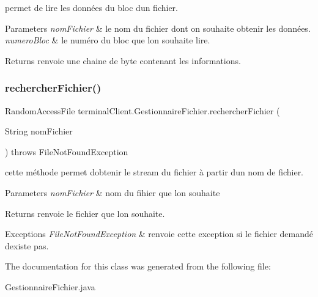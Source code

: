 permet de lire les données du bloc d\textquotesingle{}un fichier. 


\begin{DoxyParams}{Parameters}
{\em nom\+Fichier} & le nom du fichier dont on souhaite obtenir les données. \\
\hline
{\em numero\+Bloc} & le numéro du bloc que l\textquotesingle{}on souhaite lire. \\
\hline
\end{DoxyParams}
\begin{DoxyReturn}{Returns}
renvoie une chaine de byte contenant les informations. 
\end{DoxyReturn}
\mbox{\label{classterminalClient_1_1GestionnaireFichier_ae1ecacc9776836d965a472406f4e9584}} 
\subsubsection{\texorpdfstring{rechercher\+Fichier()}{rechercherFichier()}}
{\footnotesize\ttfamily Random\+Access\+File terminal\+Client.\+Gestionnaire\+Fichier.\+rechercher\+Fichier (\begin{DoxyParamCaption}\item[{String}]{nom\+Fichier }\end{DoxyParamCaption}) throws File\+Not\+Found\+Exception\hspace{0.3cm}{\ttfamily [inline]}}



cette méthode permet d\textquotesingle{}obtenir le stream du fichier à partir d\textquotesingle{}un nom de fichier. 


\begin{DoxyParams}{Parameters}
{\em nom\+Fichier} & nom du fihier que l\textquotesingle{}on souhaite \\
\hline
\end{DoxyParams}
\begin{DoxyReturn}{Returns}
renvoie le fichier que l\textquotesingle{}on souhaite. 
\end{DoxyReturn}

\begin{DoxyExceptions}{Exceptions}
{\em File\+Not\+Found\+Exception} & renvoie cette exception si le fichier demandé d\textquotesingle{}existe pas. \\
\hline
\end{DoxyExceptions}


The documentation for this class was generated from the following file\+:\begin{DoxyCompactItemize}
\item 
Gestionnaire\+Fichier.\+java\end{DoxyCompactItemize}
